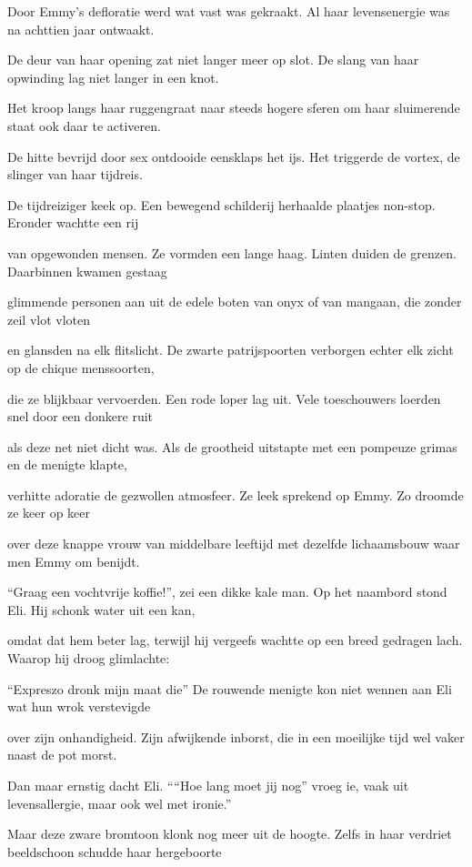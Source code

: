 Door Emmy’s defloratie
werd wat vast was gekraakt.
Al haar levensenergie
was na achttien jaar ontwaakt.

De deur van haar opening
zat niet langer meer op slot.
De slang van haar opwinding
lag niet langer in een knot.

Het kroop langs haar ruggengraat
naar steeds hogere sferen
om haar sluimerende staat
ook daar te activeren.

De hitte bevrijd door sex
ontdooide eensklaps het ijs.
Het triggerde de vortex,
de slinger van haar tijdreis.

De tijdreiziger keek op.
Een bewegend schilderij
herhaalde plaatjes non-stop.
Eronder wachtte een rij

van opgewonden mensen.
Ze vormden een lange haag.
Linten duiden de grenzen.
Daarbinnen kwamen gestaag

glimmende personen aan
uit de edele boten
van onyx of van mangaan,
die zonder zeil vlot vloten

en glansden na elk flitslicht.
De zwarte patrijspoorten
verborgen echter elk zicht
op de chique menssoorten,

die ze blijkbaar vervoerden.
Een rode loper lag uit.
Vele toeschouwers loerden
snel door een donkere ruit

als deze net niet dicht was.
Als de grootheid uitstapte
met een pompeuze grimas
en de menigte klapte,

verhitte adoratie
de gezwollen atmosfeer.
Ze leek sprekend op Emmy.
Zo droomde ze keer op keer

over deze knappe vrouw
van middelbare leeftijd
met dezelfde lichaamsbouw
waar men Emmy om benijdt.

“Graag een vochtvrije koffie!”,
zei een dikke kale man.
Op het naambord stond Eli.
Hij schonk water uit een kan,

omdat dat hem beter lag,
terwijl hij vergeefs wachtte
op een breed gedragen lach.
Waarop hij droog glimlachte:

“Expreszo dronk mijn maat die”
De rouwende menigte
kon niet wennen aan Eli
wat hun wrok verstevigde

over zijn onhandigheid.
Zijn afwijkende inborst,
die in een moeilijke tijd
wel vaker naast de pot morst.

Dan maar ernstig dacht Eli.
““Hoe lang moet jij nog” vroeg ie,
vaak uit levensallergie,
maar ook wel met ironie.”

Maar deze zware bromtoon
klonk nog meer uit de hoogte.
Zelfs in haar verdriet beeldschoon
schudde haar hergeboorte

